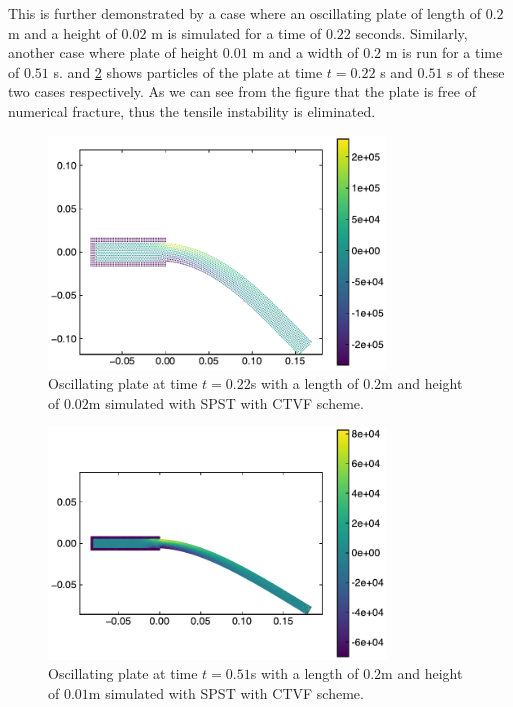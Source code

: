 \documentclass[preprint,12pt]{elsarticle}
\begin{document}
This is further demonstrated by a case where an oscillating plate of length of
$0.2$ m and a height of $0.02$ m is simulated for a time of $0.22$ seconds.
Similarly, another case where plate of height $0.01$ m and a width of $0.2$ m is
run for a time of $0.51$ s.
 and
\cref{fig:oscillating-plate:etvf-sun2019-l-0-2-h-0-01} shows particles of the
plate at time $t=0.22$ s and $0.51$ s of these two cases respectively. As we can
see from the figure that the plate is free of numerical fracture, thus the
tensile instability is eliminated.
%
%
\begin{figure}[!htpb]
  \centering
  \includegraphics[width=0.8\textwidth]{figures/oscillating_plate/etvf_sun2019_l_0_2_h_0_02}
  \caption{Oscillating plate at time $t=0.22$s with a length of $0.2$m and
    height of $0.02$m simulated with SPST with CTVF scheme.}
\label{fig:oscillating-plate:etvf-sun2019-l-0-2-h-0-22}
\end{figure}
%
%
\begin{figure}[!htpb]
  \centering
  \includegraphics[width=0.8\textwidth]{figures/oscillating_plate/etvf_sun2019_l_0_2_h_0_01}
  \caption{Oscillating plate at time $t=0.51$s with a length of $0.2$m and
    height of $0.01$m simulated with SPST with CTVF scheme.}
\label{fig:oscillating-plate:etvf-sun2019-l-0-2-h-0-01}
\end{figure}
\end{document}
